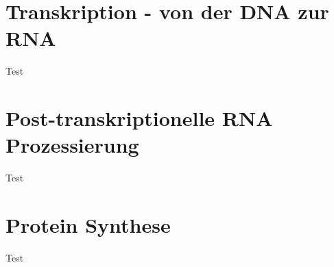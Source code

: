 \documentclass[a4paper,twocolumn,usegeometry,english,fontsize=6,DIV=16]{scrartcl}
\begin{document}
\section{Transkription - von der DNA zur RNA}
Test

\section{Post-transkriptionelle RNA Prozessierung}
Test

\section{Protein Synthese}
Test
\end{document}
